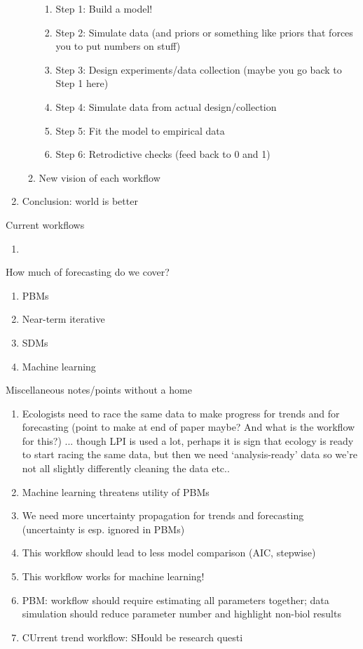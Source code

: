 \documentclass[11pt]{article}
\begin{document}
\begin{enumerate}
\begin{enumerate}
\begin{enumerate}
\item Step 1: Build a model!
\item Step 2: Simulate data (and priors or something like priors that forces you to put numbers on stuff)
\item Step 3: Design experiments/data collection (maybe you go back to Step 1 here)
\item Step 4: Simulate data from actual design/collection
\item Step 5: Fit the model to empirical data
\item Step 6: Retrodictive checks (feed back to 0 and 1)
\end{enumerate}
\item New vision of each workflow
\end{enumerate}
\item Conclusion: world is better
\end{enumerate}

Current workflows
\begin{enumerate}
\item 
\end{enumerate}

How much of forecasting do we cover?
\begin{enumerate}
\item PBMs
\item Near-term iterative
\item SDMs
\item Machine learning
\end{enumerate}


Miscellaneous notes/points without a home
\begin{enumerate}
\item Ecologists need to race the same data to make progress for trends and for forecasting (point to make at end of paper maybe? And what is the workflow for this?) ... though LPI is used a lot, perhaps it is  sign that ecology is ready to start racing the same data, but then we need `analysis-ready' data so we're not all slightly differently cleaning the data etc..
\item Machine learning threatens utility of PBMs
\item We need more uncertainty propagation for trends and forecasting (uncertainty is esp. ignored in PBMs)
\item This workflow should lead to less model comparison (AIC, stepwise)
\item This workflow works for machine learning!
\item PBM: workflow should require estimating all parameters together; data simulation should reduce parameter number and highlight non-biol results
\item CUrrent trend workflow: SHould be research questi
\end{enumerate}
\end{document}
